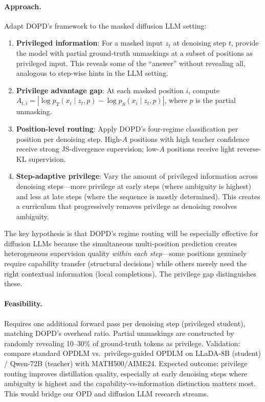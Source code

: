 \documentclass[11pt,a4paper]{article}
\begin{document}
\paragraph{Approach.} Adapt DOPD's framework to the masked diffusion LLM setting:
\begin{enumerate}
\item \textbf{Privileged information}: For a masked input $z_t$ at denoising step $t$, provide the model with partial ground-truth unmaskings at a subset of positions as privileged input. This reveals some of the ``answer'' without revealing all, analogous to step-wise hints in the LLM setting.
\item \textbf{Privilege advantage gap}: At each masked position $i$, compute $A_{t,i} = |\log p_T(x_i \mid z_t, p) - \log p_S(x_i \mid z_t, p)|$, where $p$ is the partial unmasking.
\item \textbf{Position-level routing}: Apply DOPD's four-regime classification per position per denoising step. High-$A$ positions with high teacher confidence receive strong JS-divergence supervision; low-$A$ positions receive light reverse-KL supervision.
\item \textbf{Step-adaptive privilege}: Vary the amount of privileged information across denoising steps---more privilege at early steps (where ambiguity is highest) and less at late steps (where the sequence is mostly determined). This creates a curriculum that progressively removes privilege as denoising resolves ambiguity.
\end{enumerate}
The key hypothesis is that DOPD's regime routing will be especially effective for diffusion LLMs because the simultaneous multi-position prediction creates heterogeneous supervision quality \emph{within each step}---some positions genuinely require capability transfer (structural decisions) while others merely need the right contextual information (local completions). The privilege gap distinguishes these.

\paragraph{Feasibility.} Requires one additional forward pass per denoising step (privileged student), matching DOPD's overhead ratio. Partial unmaskings are constructed by randomly revealing 10--30\% of ground-truth tokens as privilege. Validation: compare standard OPDLM vs.\ privilege-guided OPDLM on LLaDA-8B (student) / Qwen-72B (teacher) with MATH500/AIME24. Expected outcome: privilege routing improves distillation quality, especially at early denoising steps where ambiguity is highest and the capability-vs-information distinction matters most. This would bridge our OPD and diffusion LLM research streams.
\end{document}
